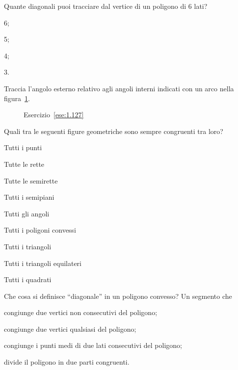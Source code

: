 \begin{esercizio}
\label{ese:1.126}
Quante diagonali puoi tracciare dal vertice di un poligono di 6 lati?
\begin{multicols}{4}
\begin{enumeratea}
\item 6;
\item 5;
\item 4;
\item 3.
\end{enumeratea}
\end{multicols}
\end{esercizio}

\begin{esercizio}
\label{ese:1.127}
Traccia l'angolo esterno relativo agli angoli interni indicati con un arco nella figura~\ref{fig:ese1.127}.
\end{esercizio}

\begin{figure}[htb]
 \centering
 \caption{Esercizio~\ref{ese:1.127}}\label{fig:ese1.127}
\end{figure}

\begin{esercizio}
\label{ese:1.128}
Quali tra le seguenti figure geometriche sono sempre congruenti tra loro?
\begin{multicols}{2}
\begin{enumeratea}
\item Tutti i punti				\tab\tab\boxV\quad\boxF
\item Tutte le rette				\tab\tab\boxV\quad\boxF
\item Tutte le semirette				\tab\boxV\quad\boxF
\item Tutti i semipiani				\tab\boxV\quad\boxF
\item Tutti gli angoli			\tab\tab\boxV\quad\boxF
\item Tutti i poligoni convessi		\tab\boxV\quad\boxF
\item Tutti i triangoli			\tab\tab\boxV\quad\boxF
\item Tutti i triangoli equilateri	\tab\boxV\quad\boxF
\item Tutti i quadrati			\tab\tab\boxV\quad\boxF
\end{enumeratea}
\end{multicols}
\end{esercizio}

\pagebreak

\begin{esercizio}
\label{ese:1.129}
Che cosa si definisce ``diagonale'' in un poligono convesso? Un segmento che
\begin{enumeratea}
\item congiunge due vertici non consecutivi del poligono;
\item congiunge due vertici qualsiasi del poligono;
\item congiunge i punti medi di due lati consecutivi del poligono;
\item divide il poligono in due parti congruenti.
\end{enumeratea}
\end{esercizio}

